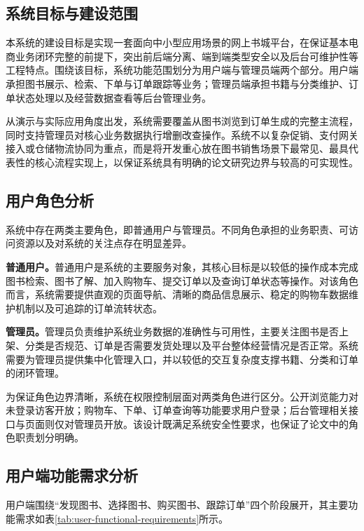 \documentclass[12pt,a4paper]{ctexart}
\begin{document}
\subsection{系统目标与建设范围}

本系统的建设目标是实现一套面向中小型应用场景的网上书城平台，在保证基本电商业务闭环完整的前提下，突出前后端分离、端到端类型安全以及后台可维护性等工程特点。围绕该目标，系统功能范围划分为用户端与管理员端两个部分。用户端承担图书展示、检索、下单与订单跟踪等业务；管理员端承担书籍与分类维护、订单状态处理以及经营数据查看等后台管理业务。

从演示与实际应用角度出发，系统需要覆盖从图书浏览到订单生成的完整主流程，同时支持管理员对核心业务数据执行增删改查操作。系统不以复杂促销、支付网关接入或仓储物流协同为重点，而是将开发重心放在图书销售场景下最常见、最具代表性的核心流程实现上，以保证系统具有明确的论文研究边界与较高的可实现性。

\subsection{用户角色分析}

系统中存在两类主要角色，即普通用户与管理员。不同角色承担的业务职责、可访问资源以及对系统的关注点存在明显差异。

\textbf{普通用户。}普通用户是系统的主要服务对象，其核心目标是以较低的操作成本完成图书检索、图书了解、加入购物车、提交订单以及查询订单状态等操作。对该角色而言，系统需要提供直观的页面导航、清晰的商品信息展示、稳定的购物车数据维护机制以及可追踪的订单流转状态。

\textbf{管理员。}管理员负责维护系统业务数据的准确性与可用性，主要关注图书是否上架、分类是否规范、订单是否需要发货处理以及平台整体经营情况是否正常。系统需要为管理员提供集中化管理入口，并以较低的交互复杂度支撑书籍、分类和订单的闭环管理。

为保证角色边界清晰，系统在权限控制层面对两类角色进行区分。公开浏览能力对未登录访客开放；购物车、下单、订单查询等功能要求用户登录；后台管理相关接口与页面则仅对管理员开放。该设计既满足系统安全性要求，也保证了论文中的角色职责划分明确。

\subsection{用户端功能需求分析}

用户端围绕“发现图书、选择图书、购买图书、跟踪订单”四个阶段展开，其主要功能需求如表\ref{tab:user-functional-requirements}所示。
\end{document}

